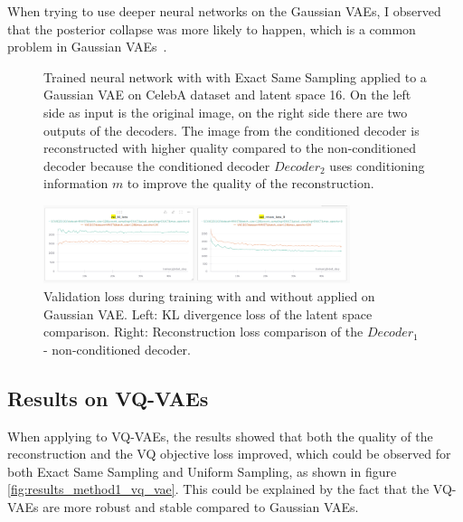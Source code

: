 When trying to use deeper neural networks on the Gaussian VAEs, I observed that the posterior collapse was more likely to happen, which is a common problem in Gaussian VAEs~\cite{wang2023posterior}.

\begin{figure}[H]
    \centering
    
    \caption[Trained neural network with  applied to a Gaussian VAE.]
    { 
        Trained neural network with  with Exact Same Sampling applied to a Gaussian VAE on CelebA dataset and latent space 16. 
        On the left side as input is the original image, on the right side there are two outputs of the decoders. 
        The image from the conditioned decoder is reconstructed with higher quality compared to the non-conditioned decoder because the conditioned decoder $Decoder_2$ uses conditioning information $m$ to improve the quality of the reconstruction.
    }
    \label{fig:res_val}
\end{figure}


\begin{figure}[H]
    \centering
    \includegraphics[width=0.8\textwidth]{figures/results/KL_and_RECON.png}
    \caption[Validation loss during training of a Gaussian VAE.]
    {
        Validation loss during training with and without  applied on Gaussian VAE.
        Left: KL divergence loss of the latent space comparison. Right: Reconstruction loss comparison of the $Decoder_1$ - non-conditioned decoder.
    }
    \label{fig:results_method1_gaussian_vae}
\end{figure}

\subsection{Results on VQ-VAEs}

When applying  to VQ-VAEs, the results showed that both the quality of the reconstruction and the VQ objective loss improved, which could be observed for both Exact Same Sampling and Uniform Sampling, as shown in figure \ref{fig:results_method1_vq_vae}. This could be explained by the fact that the VQ-VAEs are more robust and stable compared to Gaussian VAEs.

